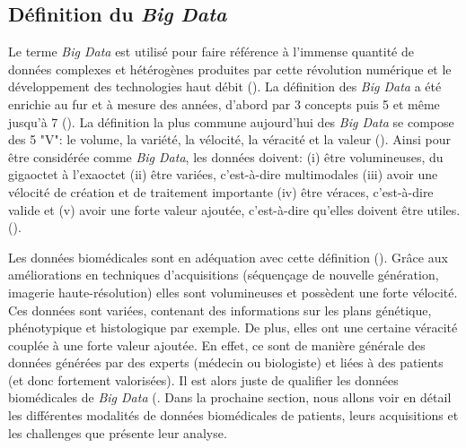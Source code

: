 \subsection{Définition du \textit{Big Data}}

Le terme \textit{Big Data} est utilisé pour faire référence à l'immense quantité de données complexes et hétérogènes produites par cette révolution numérique et le développement des technologies haut débit (\cite{de_mauro_formal_2016}). La définition des \textit{Big Data} a été enrichie au fur et à mesure des années, d'abord par 3 concepts puis 5 et même jusqu'à 7 (\cite{garcia_what_2022}). La définition la plus commune aujourd'hui des \textit{Big Data} se compose des 5 "V": le volume, la variété, la vélocité, la véracité et la valeur (\cite{ishwarappa_brief_2015}). Ainsi pour être considérée comme \textit{Big Data}, les données doivent: (i) être volumineuses, du gigaoctet à l'exaoctet (ii) être variées, c'est-à-dire multimodales (iii) avoir une vélocité de création et de traitement importante (iv) être véraces, c'est-à-dire valide et (v) avoir une forte valeur ajoutée, c'est-à-dire qu'elles doivent être utiles. (\cite{garcia_what_2022}).

Les données biomédicales sont en adéquation avec cette définition (\cite{zheng_application_2021}). Grâce aux améliorations en techniques d'acquisitions (séquençage de nouvelle génération, imagerie haute-résolution) elles sont volumineuses et possèdent une forte vélocité. Ces données sont variées, contenant des informations sur les plans génétique, phénotypique et histologique par exemple. De plus, elles ont une certaine véracité couplée à une forte valeur ajoutée. En effet, ce sont de manière générale des données générées par des experts (médecin ou biologiste) et liées à des patients (et donc fortement valorisées). Il est alors juste de qualifier les données biomédicales de \textit{Big Data} (\cite{sonawane_network_2019}. Dans la prochaine section, nous allons voir en détail les différentes modalités de données biomédicales de patients, leurs acquisitions et les challenges que présente leur analyse.

